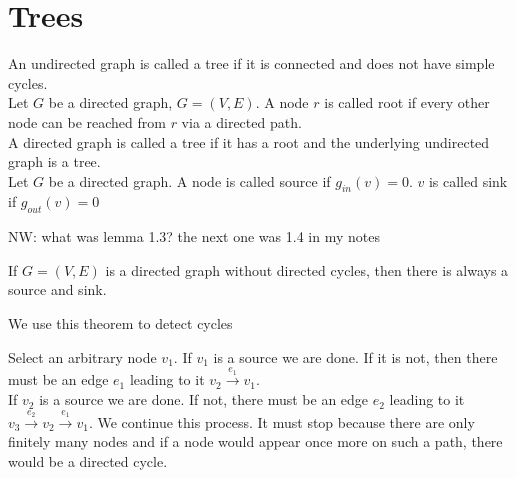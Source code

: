 \section{Trees}
\begin{definition}
    An undirected graph is called a tree if it is connected and does not have simple cycles.\\
    Let $G$ be a directed graph, $G=(V,E)$. A node $r$ is called root if every other node can be 
    reached from $r$ via a directed path. \\
    A directed graph is called a tree if it has a root and the underlying undirected graph is a tree. \\
    Let $G$ be a directed graph. A node is called source if $g_{in}(v) = 0$. $v$ is called sink if $g_{out}(v) = 0$
\end{definition}

\begin{lemma}
    NW: what was lemma 1.3? the next one was 1.4 in my notes
\end{lemma}
\begin{lemma}
    If $G=(V,E)$ is a directed graph without directed cycles, then there is always a source and sink.
\end{lemma}
We use this theorem to detect cycles

\begin{prooof}
    Select an arbitrary node $v_{1}$. If $v_{1}$ is a source we are done. If it is not, then there must be an edge $e_{1}$
    leading to it $v_{2} \xrightarrow{e_{1}} v_{1}$. \\
    If $v_{2}$ is a source we are done. If not, there must be an edge $e_{2}$ leading to it
    $v_{3}  \xrightarrow{e_{2}} v_{2} \xrightarrow{e_{1}} v_{1}$.
    We continue this process. It must stop because there are only finitely many nodes and if a node would appear once more
    on such a path, there would be a directed cycle.
\end{prooof}






